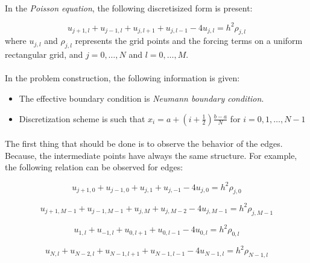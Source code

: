 \documentclass[letterpaper,12pt]{article}
\begin{document}
\paragraph{} In the \textit{Poisson equation}, the following discretisized form is present:

\begin{equation*}
    u_{j+1,l} + u_{j-1,l} + u_{j,l + 1} + u_{j,l - 1} -4u_{j,l} = h^2\rho_{j,l} 
\end{equation*}
where $u_{j,l}$ and $\rho_{j,l}$ represents the grid points and the forcing terms on a uniform rectangular grid, and $j = 0, \dots, N $ and $l = 0, \dots, M$.

\paragraph{} In the problem construction, the following information is given:
\begin{itemize}
    \item The effective boundary condition is \textit{Neumann boundary condition}.
    \item Discretization scheme is such that $x_i = a + \left(i + \frac{1}{2}\right)\frac{b-a}{N}$ for $i = 0, 1, \dots, N-1$
\end{itemize}

\paragraph{} The first thing that should be done is to observe the behavior of the edges. Because, the intermediate points have always the same structure. For example, the following relation can be observed for edges:

\begin{equation}
    \label{eq:y0dd1}
    u_{j+1,0} + u_{j-1,0} + u_{j,1} + u_{j,- 1} -4u_{j,0} = h^2\rho_{j,0} 
\end{equation}

\begin{equation}
    \label{eq:y0dd2}
    u_{j+1,M-1} + u_{j-1,M-1} + u_{j,M} + u_{j,M - 2} -4u_{j,M-1} = h^2\rho_{j,M-1} 
\end{equation}

\begin{equation}
    \label{eq:yNdd1}
    u_{1,l} + u_{-1,l} + u_{0,l + 1} + u_{0,l - 1} -4u_{0,l} = h^2\rho_{0,l} 
\end{equation}

\begin{equation}
    \label{eq:yNdd2}
    u_{N,l} + u_{N-2,l} + u_{N-1,l + 1} + u_{N-1,l - 1} -4u_{N-1,l} = h^2\rho_{N-1,l} 
\end{equation}
\end{document}
